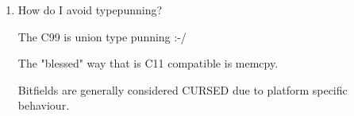 \documentclass[11pt]{article}
\begin{document}
\begin{enumerate}
\item How do I avoid typepunning?
\label{sec:org55c51b1}

The C99 is union type punning :-/

The "blessed" way that is C11 compatible is memcpy.

Bitfields are generally considered CURSED due to platform specific
behaviour.
\end{enumerate}
\end{document}
